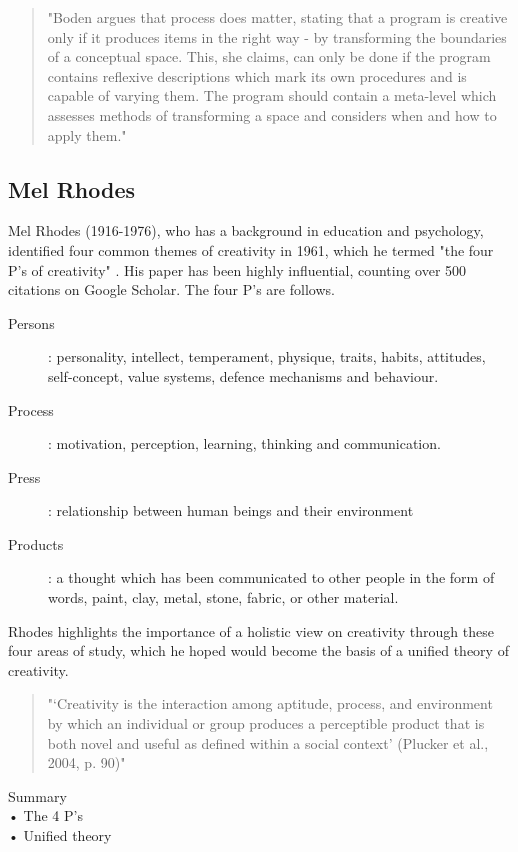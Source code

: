 \begin{quote}
"Boden argues that process does matter, stating that a program is creative only if it produces items in the right way - by transforming the boundaries of a conceptual space. This, she claims, can only be done if the program contains reflexive descriptions which mark its own procedures and is capable of varying them. The program should contain a meta-level which assesses methods of transforming a space and considers when and how to apply them."  \citep[p.8]{Pease2001}
\end{quote}

\subsection{Mel Rhodes}

Mel Rhodes (1916-1976), who has a background in education and psychology, identified four common themes of creativity in 1961, which he termed "the four P’s of creativity" \citep{Rhodes1961}. His paper has been highly influential, counting over 500 citations on Google Scholar. The four P’s are follows.

\begin{description}
\item [Persons]: 	personality, intellect, temperament, physique, traits, habits, attitudes, self-concept, value systems, defence mechanisms and behaviour.
\item [Process]: 	motivation, perception, learning, thinking and communication.
\item [Press]: 		relationship between human beings and their environment
\item [Products]: 	a thought which has been communicated to other people in the form of words, paint, clay, metal, stone, fabric, or other material.
\end{description}

Rhodes highlights the importance of a holistic view on creativity through these four areas of study, which he hoped would become the basis of a unified theory of creativity.

\begin{quote}
"‘Creativity is the interaction among aptitude, process, and environment by which an individual or group produces a perceptible product that is both novel and useful as defined within a social context’ (Plucker et al., 2004, p. 90)" \citep{Jordanous2012}
\end{quote}

\begin{shaded}
Summary\\
•	The 4 P’s\\
•	Unified theory
\end{shaded}


